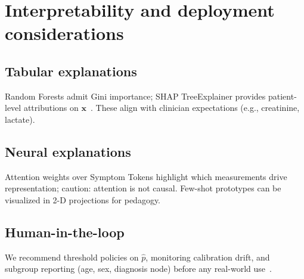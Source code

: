 \section{Interpretability and deployment considerations}
\label{sec:interp}

\subsection{Tabular explanations}
Random Forests admit Gini importance; SHAP TreeExplainer provides patient-level attributions on $\mathbf{x}$~\citep{caruana2015intelligible}. These align with clinician expectations (e.g., creatinine, lactate).

\subsection{Neural explanations}
Attention weights over Symptom Tokens highlight which measurements drive representation; caution: attention is not causal. Few-shot prototypes can be visualized in 2-D projections for pedagogy.

\subsection{Human-in-the-loop}
We recommend threshold policies on $\hat{p}$, monitoring calibration drift, and subgroup reporting (age, sex, diagnosis node) before any real-world use~\citep{ghassemi2021practical}.
